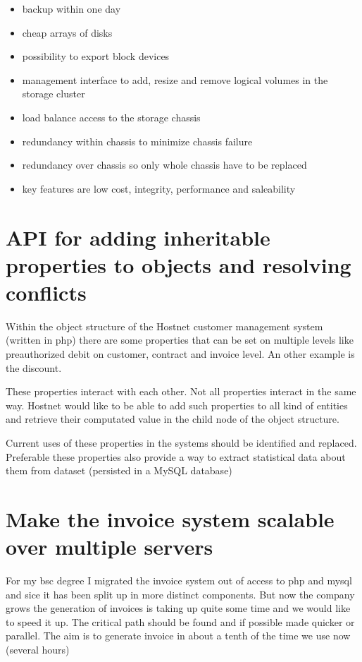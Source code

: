 \documentclass[a4paper,10pt]{article}
\begin{document}
\begin{itemize}
\item backup within one day
\item cheap arrays of disks
\item possibility to export block devices
\item management interface to add, resize and remove logical volumes in the storage cluster
\item load balance access to the storage chassis
\item redundancy within chassis to minimize chassis failure
\item redundancy over chassis so only whole chassis have to be replaced
\item key features  are low cost, integrity, performance and saleability
\end{itemize}

\section{API for adding inheritable properties to objects and resolving conflicts}
Within the object structure of the Hostnet customer management system (written in php) there are some properties that can be set on multiple levels like preauthorized debit on customer, contract and invoice level. An other example is the discount. 

These properties interact with each other. Not all properties interact in the same way. Hostnet would like to be able to add such properties to all kind of entities and retrieve their computated value in the child node of the object structure.

Current uses of these properties in the systems should be identified and replaced. Preferable these properties also provide a way to extract statistical data about them from dataset (persisted in a MySQL database)

\section{Make the invoice system scalable over multiple servers}
For my bsc degree I migrated the invoice system out of access to php and mysql and sice it has been  split up in more distinct components. But now the company grows the generation of invoices is taking up quite some time and we would like to speed it up. The critical path should be found and if possible made quicker or parallel. The aim is to generate invoice in about a tenth of the time we use now (several hours)
\end{document}
